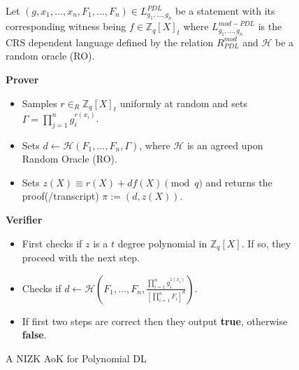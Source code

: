 \begin{figure}[ht]
    \centering
    \begin{tcolorbox}[title=$\pi_{PDL}^{AOK}$, width=0.9\textwidth, colframe=blue!75!black, colback=blue!10, sharp corners]
        Let $(g,x_1,\dots,x_n,F_1,\dots,F_n)\in L_{g_1,\dots,g_n}^{PDL}$ be a statement with its corresponding witness being $f\in\mathbb{Z}_q[X]_t$ 
        where $L_{g_1,\dots,g_n}^{mod-PDL}$ is the CRS dependent language defined by the relation $R_{PDL}^{mod}$ and $\mathcal{H}$ be a 
        random oracle (RO).
        
        \vspace{0.5em}
        \textbf{Prover}
        \begin{itemize}
            \item Samples $r\in_{R}\mathbb{Z}_q[X]_{t}$ uniformly at random and sets 
                $\Gamma=\prod_{j=1}^{n}g_i^{r(x_i)}$.
            \item Sets $d\leftarrow \mathcal{H}(F_1, \dots, F_n, \Gamma)$, where $\mathcal{H}$ is 
                an agreed upon Random Oracle (RO).
            \item Sets $z(X)\equiv r(X)+df(X) \pmod{q}$ and returns the proof(/transcript) $\pi:= (d,z(X))$.
        \end{itemize}
        
        \vspace{0.5em}
        \textbf{Verifier}
        \begin{itemize}
            \item First checks if $z$ is a $t$ degree polynomial in $\mathbb{Z}_q[X]$. If so, they proceed with the next step.
            \item Checks if $d\leftarrow \mathcal{H}(F_1, \dots, F_n,\frac{\prod_{i=1}^{n}g_i^{z(x_i)}}{[\prod_{i=1}^{n}F_i]^d})$. 
            \item If first two steps are correct then they output \textbf{true}, otherwise \textbf{false}.
        \end{itemize}
    \end{tcolorbox}
    \caption{A NIZK AoK for Polynomial DL}
    \label{fig:aok-polynomial-dl}
\end{figure}
